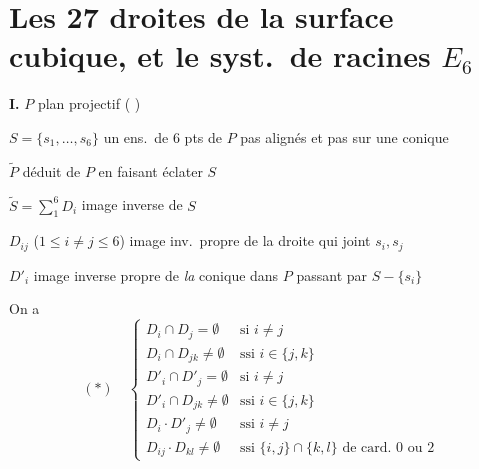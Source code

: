 \documentclass[11pt,a4paper]{article}
\begin{document}
\section{Les 27 droites de la surface cubique, et le syst.\ de racines $E_6$}

\textbf{I.} $P$ plan projectif ( \ill{} \ill{} \ill{})

$S = \{s_1, \dots, s_6\}$ un ens.\ de $6$ pts de $P$ \struck{\ill{}}
 pas  alignés et pas
\struck{\ill{}}  sur une conique

$\widetilde{P}$ déduit de $P$ en faisant éclater $S$

$\widetilde{S} = \sum_{1}^{6} D_i$ image inverse de $S$

$D_{ij}$ ($1 \leq i \neq j \leq 6$) image inv.\ propre de la droite qui joint
$s_i, s_j$

$D'_i$ image inverse propre de \emph{la} conique dans $P$ passant par
$S - \{s_i\}$

On a
\[
(\ast)\quad
\begin{cases}
D_i \cap D_j = \emptyset & \text{si } i \neq j \\
D_i \cap D_{jk} \neq \emptyset & \text{ssi } i \in \{j, k\} \\
D'_i \cap D'_j = \emptyset & \text{si } i \neq j \\
D'_i \cap D_{jk} \neq \emptyset & \text{ssi } i \in \{j, k\} \\
D_i \cdot D'_j \neq \emptyset & \text{ssi } i \neq j \\
D_{ij} \cdot D_{kl} \neq \emptyset & \text{ssi } \{i,j\} \cap \{k,l\} \text{ de card.\ } 0 \text{ ou } 2
\end{cases}
\]
\end{document}
